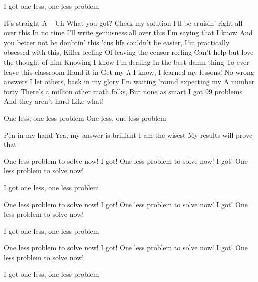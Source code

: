 \documentclass[a4paper,11pt]{article}
\begin{document}
\begin{song}
 I got one less, one less problem

 It's straight A+
Uh
What you got?
Check my solution
I'll be cruisin' right all over this
In no time
I'll write geniusness all over this
I'm saying that I know
And you better not be doubtin' this
'cus life couldn't be easier,
I'm practically obsessed with this,
Killer feeling
Of leaving the censor reeling
Can't help but love the thought of him
Knowing I know I'm dealing
In the best damn thing
To ever leave this classroom
Hand it in
Get my A
I know, I learned my lessons!
No wrong answers
I let others, bask in my glory
I'm waiting 'round expecting my
A number forty
There's a million other math folks,
But none as smart
I got 99 problems
And they aren't hard
Like what!


 One less, one less problem
One less, one less problem

 Pen in my hand
Yea, my answer is brilliant
I am the wisest
My results will prove that


 One less problem to solve now!
I got!
One less problem to solve now!
I got!
One less problem to solve now!

 I got one less, one less problem


 One less problem to solve now!
I got!
One less problem to solve now!
I got!
One less problem to solve now!

 I got one less, one less problem


 One less problem to solve now!
I got!
One less problem to solve now!
I got!
One less problem to solve now!

 I got one less, one less problem






\end{song}
\end{document}
